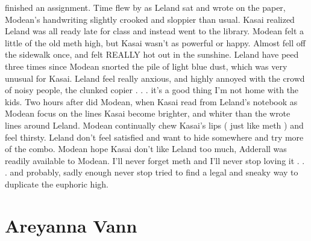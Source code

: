 \documentclass[12pt]{book}
\begin{document}
finished an assignment. Time flew by as Leland sat and wrote on the paper, Modean's handwriting slightly crooked and sloppier than usual. Kasai realized Leland was all ready late for class and instead went to the library. Modean felt a little of the old meth high, but Kasai wasn't as powerful or happy. Almost fell off the sidewalk once, and felt REALLY hot out in the sunshine. Leland have peed three times since Modean snorted the pile of light blue dust, which was very unusual for Kasai. Leland feel really anxious, and highly annoyed with the crowd of noisy people, the clunked copier . . . it's a good thing I'm not home with the kids. Two hours after did Modean, when Kasai read from Leland's notebook as Modean focus on the lines Kasai become brighter, and whiter than the wrote lines around Leland. Modean continually chew Kasai's lips ( just like meth ) and feel thirsty. Leland don't feel satisfied and want to hide somewhere and try more of the combo. Modean hope Kasai don't like Leland too much, Adderall was readily available to Modean. I'll never forget meth and I'll never stop loving it . . . and probably, sadly enough never stop tried to find a legal and sneaky way to duplicate the euphoric high.






\chapter{Areyanna Vann}
\end{document}
